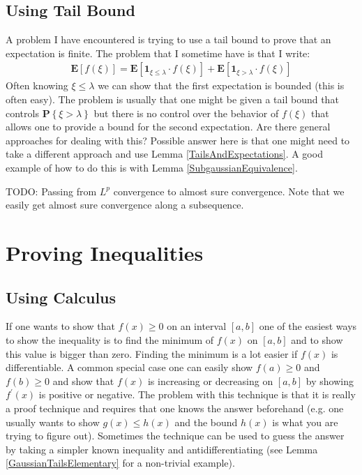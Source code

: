\documentclass{amsbook}
\theoremstyle{definition}
\theoremstyle{remark}
\newcommand{\expectation}[1]{\textbf{E}\left[#1\right]}
\newcommand{\probability}[1]{\textbf{P}\left \{#1 \right \}}
\newcommand{\characteristic}[1]{\textbf{1}_{#1}}
\begin{document}
\subsection{Using Tail Bound}
A problem I have encountered is trying to use a tail bound to prove
that an expectation is finite.  The problem that I sometime have is
that I write:
\begin{align*}
\expectation{f(\xi)} = \expectation{ \characteristic{\xi \leq \lambda}
  \cdot f(\xi)} + \expectation{\characteristic{\xi > \lambda} \cdot f(\xi)}
\end{align*}
Often knowing $\xi \leq \lambda$ we can show that the first
expectation is bounded (this is often easy).  The problem is usually
that one might be given a tail bound that controls $\probability{\xi >
  \lambda}$ but there is no control over the behavior of $f(\xi)$ that
allows one to provide a bound for the second expectation.  Are there
general approaches for dealing with this?  Possible answer here is
that one might need to take a different approach and use Lemma
\ref{TailsAndExpectations}.  A good example of how to do this is with 
Lemma \ref{SubgaussianEquivalence}.

TODO: Passing from $L^p$ convergence to almost sure convergence.  Note
that we easily get almost sure convergence along a subsequence.

\section{Proving Inequalities}
\subsection{Using Calculus}
If one wants to show that $f(x) \geq 0$ on an interval $[a,b]$ one of
the easiest ways to show the inequality is to find the minimum of
$f(x)$ on $[a,b]$ and to show this value is bigger than zero.  Finding
the minimum is a lot easier if $f(x)$ is differentiable.  A common
special case one can easily show $f(a) \geq 0$ and $f(b) \geq
0$ and show that $f(x)$ is increasing or decreasing on $[a,b]$ by
showing $f^{\prime}(x)$ is positive or negative.  The problem with
this technique is that it is really a proof technique and requires
that one knows the answer beforehand (e.g. one usually wants to show
$g(x) \leq h(x)$ and the bound $h(x)$ is what you are trying to figure
out).  Sometimes the technique can be
used to guess the answer by taking a simpler known inequality and
antidifferentiating (see Lemma \ref{GaussianTailsElementary} for a
non-trivial example).
\end{document}
